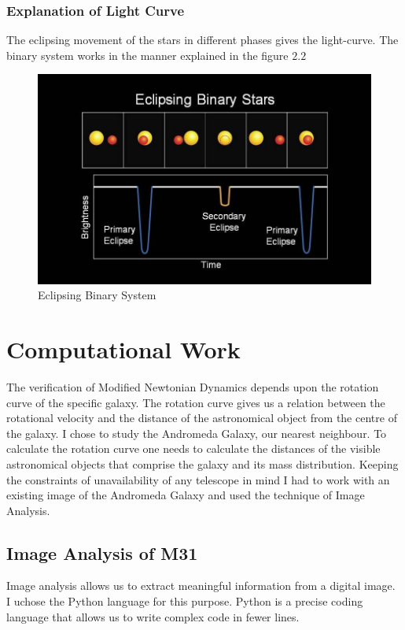 \subsubsection*{Explanation of Light Curve}

 The eclipsing movement of the stars in different phases gives the light-curve. The binary system works in the manner explained in the figure $2.2$ 
\cite{sys}
\begin{figure} [h]
\centering
\includegraphics[scale=0.5]{Light}
\caption{Eclipsing Binary System}
\end{figure}

\section{Computational Work}
The verification of Modified Newtonian Dynamics depends upon the rotation curve of the specific galaxy. The rotation curve gives us a relation between the rotational velocity and the distance of the astronomical object from the centre of the galaxy. I chose to study the Andromeda Galaxy, our nearest neighbour. To calculate the rotation curve one needs to calculate the distances of the visible astronomical objects that comprise the galaxy and its mass distribution. Keeping the constraints of unavailability of any telescope in mind I had to work with an existing image of the Andromeda Galaxy and used the technique of Image Analysis.

\subsection{Image Analysis of M31}

Image analysis allows us to extract meaningful information from a digital image. I uchose the Python language for this purpose. Python is a precise coding language that allows us to write complex code in fewer lines.

